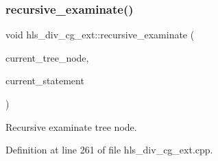 \subsubsection{\texorpdfstring{recursive\+\_\+examinate()}{recursive\_examinate()}}
{\footnotesize\ttfamily void hls\+\_\+div\+\_\+cg\+\_\+ext\+::recursive\+\_\+examinate (\begin{DoxyParamCaption}\item[{const \hyperlink{tree__node_8hpp_a6ee377554d1c4871ad66a337eaa67fd5}{tree\+\_\+node\+Ref} \&}]{current\+\_\+tree\+\_\+node,  }\item[{const \hyperlink{tree__node_8hpp_a6ee377554d1c4871ad66a337eaa67fd5}{tree\+\_\+node\+Ref} \&}]{current\+\_\+statement }\end{DoxyParamCaption})\hspace{0.3cm}{\ttfamily [protected]}}



Recursive examinate tree node. 



Definition at line 261 of file hls\+\_\+div\+\_\+cg\+\_\+ext.\+cpp.



